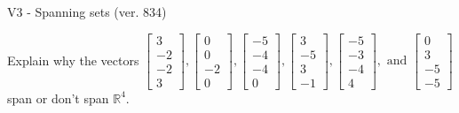 \begin{exercise}
  \begin{exerciseTitle}V3 - Spanning sets (ver. 834)\end{exerciseTitle}
  \begin{exerciseStatement}
    Explain why the vectors \(\left[\begin{array}{r}
3 \\
-2 \\
-2 \\
3
\end{array}\right] , \left[\begin{array}{r}
0 \\
0 \\
-2 \\
0
\end{array}\right] , \left[\begin{array}{r}
-5 \\
-4 \\
-4 \\
0
\end{array}\right] , \left[\begin{array}{r}
3 \\
-5 \\
3 \\
-1
\end{array}\right] , \left[\begin{array}{r}
-5 \\
-3 \\
-4 \\
4
\end{array}\right] , \text{ and } \left[\begin{array}{r}
0 \\
3 \\
-5 \\
-5
\end{array}\right]\) span or don't span \(\mathbb{R}^4\). 
	



\end{exerciseStatement}
\end{exercise}
